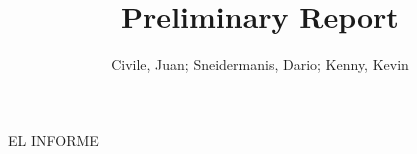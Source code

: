 \documentclass[11pt,a4paper,titlepage]{report}
\author{Civile, Juan; Sneidermanis, Dario; Kenny, Kevin}
\title{Preliminary Report}
\begin{document}
EL INFORME
\end{document}
